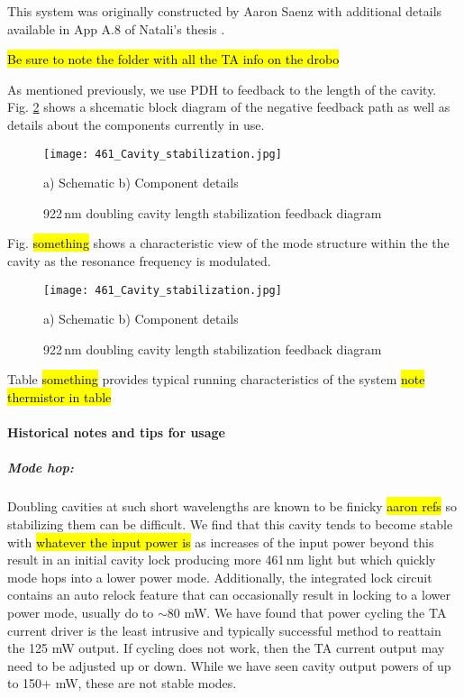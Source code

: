 This system was originally constructed by Aaron Saenz \cite{AaronDSaenz2005} with additional details available in App A.8 of Natali's thesis \cite{MartinezdeEscolar2010}.

\hl{Be sure to note the folder with all the TA info on the drobo}

As mentioned previously, we use PDH to feedback to the length of the cavity. 
Fig. \ref{fig:922cavityLock} shows a shcematic block diagram of the negative feedback path as well as details about the components currently in use.
	\begin{figure}
		\centerline{
		\texttt{[image: 461\_Cavity\_stabilization.jpg]}}
		\caption{922\,nm doubling cavity length stabilization feedback diagram}{a) Schematic b) Component details}
		\label{fig:922cavityLock}
	\end{figure}
	
Fig. \hl{something} shows a characteristic view of the mode structure within the the cavity as the resonance frequency is modulated.
	\begin{figure}
		\centerline{
		\texttt{[image: 461\_Cavity\_stabilization.jpg]}}
		\caption{922\,nm doubling cavity length stabilization feedback diagram}{a) Schematic b) Component details}
		\label{fig:922cavityLock}
	\end{figure}

Table \hl{something} provides typical running characteristics of the system \hl{note thermistor in table}

\paragraph{Historical notes and tips for usage}
\subparagraph{Mode hop:} 
Doubling cavities at such short wavelengths are known to be finicky \hl{aaron refs} so stabilizing them can be difficult. 
We find that this cavity tends to become stable with \hl{whatever the input power is} as increases of the input power beyond this result in an initial cavity lock producing more 461\,nm light but which quickly mode hops into a lower power mode.
Additionally, the integrated lock circuit contains an auto relock feature that can occasionally result in locking to a lower power mode, usually do to $\sim$80 mW.
We have found that power cycling the TA current driver is the least intrusive and typically successful method to reattain the 125 mW output.
If cycling does not work, then the TA current output may need to be adjusted up or down.
While we have seen cavity output powers of up to 150+ mW, these are not stable modes.

